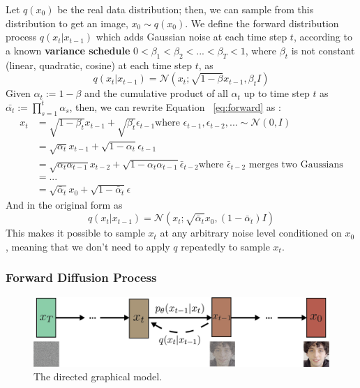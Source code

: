 \documentclass[preprint]{elsarticle}
\begin{document}
Let $q(x_0)$ be the real data distribution; then, we can sample from this distribution to get an image, $x_0 \sim q(x_0)$. 
We define the forward distribution process $q(x_t|x_{t-1})$ which adds Gaussian noise at each time step $t$, 
according to a known \textbf{variance schedule} $0<\beta_1<\beta_2<...<\beta_T<1$, where $\beta_t$ 
is not constant (linear, quadratic, cosine) at each time step $t$, 
as
\begin{equation} \label{eq:forward}
	q(x_t|x_{t-1}) = \mathcal{N}(x_t; \sqrt{1-\beta}x_{t-1}, \beta_t I)
\end{equation}
Given $\alpha_t:=1-\beta$ and the cumulative product of all $\alpha_t$ up to time step $t$ as 
$\bar{\alpha_t} := \prod_{s=1}^t\alpha_s$, then, we can rewrite Equation ~\ref{eq:forward} as 
\cite{weng2021diffusion}:
\begin{equation}
	\begin{split}
		x_t & = \sqrt{1-\beta_t}x_{t-1} + \sqrt{\beta_t}\epsilon_{t-1}
		\text{where $\epsilon_{t-1},\epsilon_{t-2},... \sim \mathcal{N}(0,I)$}\\
		& = \sqrt{\alpha_t}x_{t-1} + \sqrt{1-\alpha_t}\epsilon_{t-1} \\
		& = \sqrt{\alpha_t\alpha_{t-1}}x_{t-2} + \sqrt{1-\alpha_t\alpha_{t-1}}\bar{\epsilon}_{t-2} 
		\text{where $\bar{\epsilon}_{t-2}$ merges two Gaussians}\\
		& = ... \\
		& = \sqrt{\bar{\alpha}_t}x_0 + \sqrt{1-\bar{\alpha}_t}\epsilon 
	\end{split}
\end{equation}
And in the original form as
\begin{equation} \label{eq:forward2}
	q(x_t|x_{t-1}) = \mathcal{N}(x_t; \sqrt{\bar{\alpha}_t}x_0, (1 -\bar{\alpha}_t) I)
\end{equation}
This makes it possible to sample $x_t$ at any arbitrary noise level conditioned on $x_0$,
meaning that we don't need to apply $q$ repeatedly to sample $x_t$.


\subsubsection{Forward Diffusion Process}
\begin{figure}[b]
	\centering
	\includegraphics[scale=0.74, keepaspectratio]{img/background_img/Diffusion2.png}
	\caption{The directed graphical model.}\label{fig:m-chain}
\end{figure}
\end{document}
